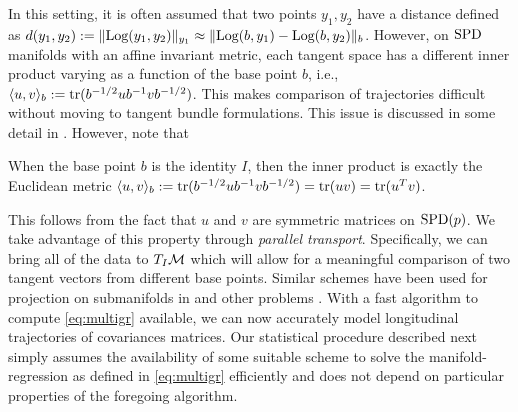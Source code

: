 In this setting, it is often assumed that two points $y_1,y_2$ have a distance defined as $d(y_1,y_2) := \| \text{Log}(y_1,y_2) \|_{y_1} \approx \| \text{Log}(b,y_1)-\text{Log}(b,y_2) \|_{b}$. However,
on $\text{SPD}$ manifolds with an affine invariant metric, each tangent space has a different inner product varying as a function of the base point $b$, i.e., $\langle  u,v\rangle_b:= \text{tr} (b^{-1/2}ub^{-1}vb^{-1/2})$. This makes comparison of trajectories difficult without moving to tangent bundle formulations. This issue is discussed in some detail in \cite{muralidharan2012sasaki,hong2015group}. However, note that
\begin{remark}
When the base point $b$ is the identity $I$, then the inner product is exactly the Euclidean metric $\langle  u,v\rangle_b:= \text{tr} (b^{-1/2}ub^{-1}vb^{-1/2})=\text{tr} (uv)=\text{tr} (u^Tv)$.
\end{remark}
This follows from the fact that $u$ and $v$ are symmetric matrices on $\text{SPD}(p)$. We take advantage of this property
through \textit{parallel transport}. Specifically, we can bring all of the data to $T_{I}\mathcal{M}$ which will allow for a meaningful comparison of two tangent vectors from different base points.
Similar schemes have been used for projection on submanifolds in \cite{xie2010statistical} and other problems \citep{sommer2014optimization}. 
%
With a fast algorithm to compute \eqref{eq:multigr} available, we can now accurately model longitudinal trajectories of covariances matrices.
Our statistical procedure described next simply assumes 
the availability of some suitable scheme to solve the manifold-regression as defined in \eqref{eq:multigr} efficiently and does not
depend on particular properties of the foregoing algorithm. 
%
